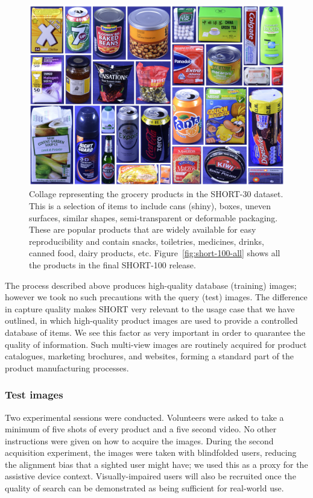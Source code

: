 \begin{figure}[]
\centering
\includegraphics[width=\textwidth]{./gfx/Chapter03/icip-all-products.jpg}
\caption{Collage representing the grocery products in the SHORT-30 dataset. This is a selection of items to include cans (shiny), boxes, uneven surfaces, similar shapes, semi-transparent or deformable packaging. These are popular products that are widely available for easy reproducibility and contain snacks, toiletries, medicines, drinks, canned food, dairy products, etc. Figure~\ref{fig:short-100-all} shows all the products in the final SHORT-100 release.}
\label{fig:collage-all}
\end{figure}


The process described above produces high-quality database (training) images; however we took no such precautions with the query (test) images. The difference in capture quality makes SHORT very relevant to the usage case that we have outlined, in which high-quality product images are used to provide a controlled database of items.  We see this factor as very important in order to quarantee the quality of information.  Such multi-view images are routinely acquired for product catalogues, marketing brochures, and websites, forming a standard part of the product manufacturing processes.

\subsubsection{Test images}

Two experimental sessions were conducted. Volunteers were asked to take a minimum of five shots of every product and a five second video. No other instructions were given on how to acquire the images. During the second acquisition experiment, the images were taken with blindfolded users, reducing the alignment bias that a sighted user might have; we used this as a proxy for the assistive device context.  Visually-impaired users will also be recruited once the quality of search can be demonstrated as being sufficient for real-world use.


